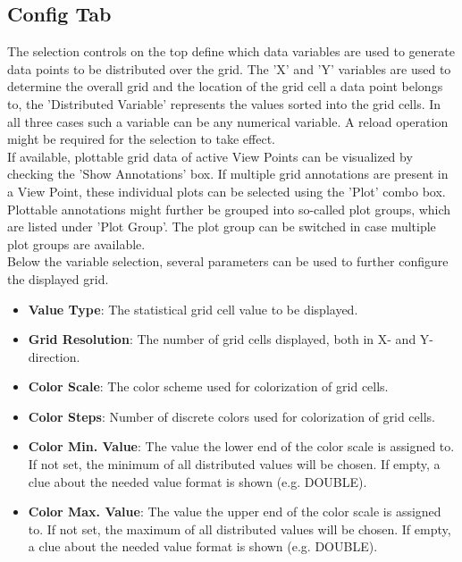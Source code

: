 \subsection{Config Tab}

The selection controls on the top define which data variables are used to generate data points to be distributed over the grid.
The 'X' and 'Y' variables are used to determine the overall grid and the location of the grid cell a data point belongs to,
the 'Distributed Variable' represents the values sorted into the grid cells.
In all three cases such a variable can be any numerical variable. A reload operation might be required for the selection to take effect. \\

If available, plottable grid data of active View Points can be visualized by checking the 'Show Annotations' box.
If multiple grid annotations are present in a View Point, these individual plots can be selected using the 'Plot' combo box.
Plottable annotations might further be grouped into so-called plot groups, which are listed under 'Plot Group'.
The plot group can be switched in case multiple plot groups are available. \\

Below the variable selection, several parameters can be used to further configure the displayed grid.

\begin{itemize}
    \item \textbf{Value Type}: The statistical grid cell value to be displayed.
    \item \textbf{Grid Resolution}: The number of grid cells displayed, both in X- and Y-direction. 
    \item \textbf{Color Scale}: The color scheme used for colorization of grid cells.
    \item \textbf{Color Steps}: Number of discrete colors used for colorization of grid cells.
    \item \textbf{Color Min. Value}: The value the lower end of the color scale is assigned to. 
        If not set, the minimum of all distributed values will be chosen.
        If empty, a clue about the needed value format is shown (e.g. DOUBLE). 
    \item \textbf{Color Max. Value}: The value the upper end of the color scale is assigned to. 
        If not set, the maximum of all distributed values will be chosen.
        If empty, a clue about the needed value format is shown (e.g. DOUBLE). 
   \end{itemize}
   \ \\

